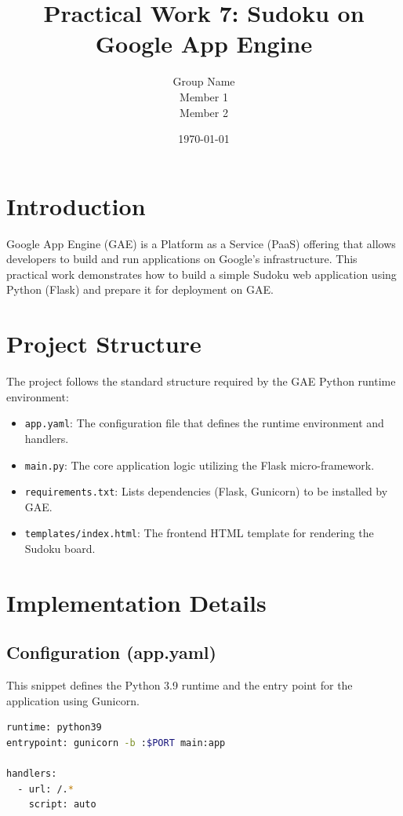 \documentclass[a4paper,12pt]{article}
\title{Practical Work 7: Sudoku on Google App Engine}
\author{Group Name \\ Member 1 \\ Member 2}
\date{\today}
\begin{document}
\maketitle

\section{Introduction}
Google App Engine (GAE) is a Platform as a Service (PaaS) offering that allows developers to build and run applications on Google's infrastructure. This practical work demonstrates how to build a simple Sudoku web application using Python (Flask) and prepare it for deployment on GAE.

\section{Project Structure}
The project follows the standard structure required by the GAE Python runtime environment:

\begin{itemize}
    \item \texttt{app.yaml}: The configuration file that defines the runtime environment and handlers.
    \item \texttt{main.py}: The core application logic utilizing the Flask micro-framework.
    \item \texttt{requirements.txt}: Lists dependencies (Flask, Gunicorn) to be installed by GAE.
    \item \texttt{templates/index.html}: The frontend HTML template for rendering the Sudoku board.
\end{itemize}

\section{Implementation Details}

\subsection{Configuration (app.yaml)}
This snippet defines the Python 3.9 runtime and the entry point for the application using Gunicorn.

\begin{lstlisting}[language=bash]
runtime: python39
entrypoint: gunicorn -b :$PORT main:app

handlers:
  - url: /.*
    script: auto
\end{lstlisting}
\end{document}
